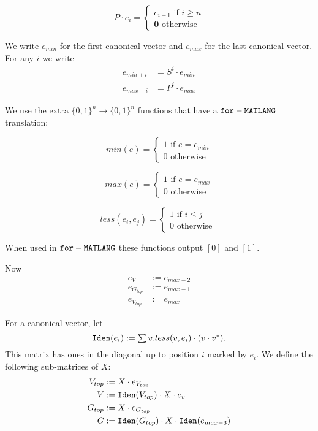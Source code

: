 \[
  			P\cdot e_i=\begin{cases}
               e_{i-1} \text{ if } i\geq n \\
               \mathbf{0} \text{ otherwise }
            \end{cases}
\]

We write $e_{min}$ for the first canonical vector and $e_{max}$ for the last canonical vector. For any $i$ we write 
\begin{align*}
	e_{min+i} &= S^i\cdot e_{min} \\
	e_{max+i} &= P^i\cdot e_{max}
\end{align*}

We use the extra $\lbrace 0,1 \rbrace^n\rightarrow\lbrace 0,1 \rbrace^n$ functions that have a $\texttt{for}-\texttt{MATLANG}$ translation:

\[
  			min(e)=\begin{cases}
               1 \text{ if } e=e_{min} \\
               0 \text{ otherwise }
             \end{cases}
\]

\[
  			max(e)=\begin{cases}
               1 \text{ if } e=e_{max} \\
               0 \text{ otherwise }
             \end{cases}
\]

\[
  			less(e_i,e_j)=\begin{cases}
               1 \text{ if } i\leq j \\
               0 \text{ otherwise }
             \end{cases}
\]

When used in $\texttt{for}-\texttt{MATLANG}$ these functions output $[0]$ and $[1]$.

Now 
\begin{align*}
	e_{V}&:=e_{max-2} \\
	e_{G_{top}}&:=e_{max-1} \\
	e_{V_{top}}&:=e_{max}
\end{align*}

For a canonical vector, let $$\texttt{Iden}(e_i):=\textstyle\sum v. less(v,e_i)\cdot (v\cdot v^*).$$ This matrix has ones in the diagonal up to position $i$ marked by $e_{i}$. We define the following sub-matrices of $X$:
\begin{align*}
	V_{top} &:= X\cdot e_{V_{top}} \\
	V &:= \texttt{Iden}(V_{top}) \cdot X \cdot e_v \\
 	G_{top} &:=X\cdot e_{G_{top}} \\
 	G &:= \texttt{Iden}(G_{top})\cdot X \cdot \texttt{Iden}(e_{max-3})
\end{align*}

